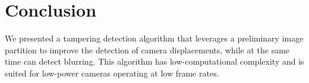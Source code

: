 \documentclass{llncs}
\begin{document}
%


\section{Conclusion}\label{sec:Conclusion}
We presented a tampering detection algorithm that leverages a preliminary image partition to improve the detection of camera displacements, while at the same time can detect blurring. This algorithm has low-computational complexity and is suited for low-power cameras operating at low frame rates.
\end{document}
